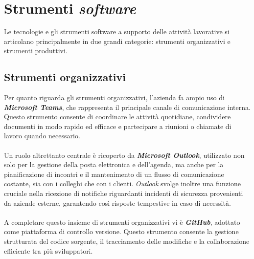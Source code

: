 \section{Strumenti \textit{software}}  
Le tecnologie e gli strumenti software a supporto delle attività lavorative si articolano principalmente in due grandi categorie: strumenti organizzativi e strumenti produttivi.  
\subsection{Strumenti organizzativi}  
Per quanto riguarda gli strumenti organizzativi, l'azienda fa ampio uso di \textbf{\textit{Microsoft Teams}}, che rappresenta il principale canale di comunicazione interna. Questo strumento consente di coordinare le attività quotidiane, condividere documenti in modo rapido ed efficace e partecipare a riunioni o chiamate di lavoro quando necessario.\\\\
Un ruolo altrettanto centrale è ricoperto da \textbf{\textit{Microsoft Outlook}}, utilizzato non solo per la gestione della posta elettronica e dell'agenda, ma anche per la pianificazione di incontri e il mantenimento di un flusso di comunicazione costante, sia con i colleghi che con i clienti. \textit{Outlook} svolge inoltre una funzione cruciale nella ricezione di notifiche riguardanti incidenti di sicurezza provenienti da aziende esterne, garantendo così risposte tempestive in caso di necessità.\\\\
A completare questo insieme di strumenti organizzativi vi è \textbf{\textit{GitHub}}, adottato come piattaforma di controllo versione. Questo strumento consente la gestione strutturata del codice sorgente, il tracciamento delle modifiche e la collaborazione efficiente tra più sviluppatori.  
